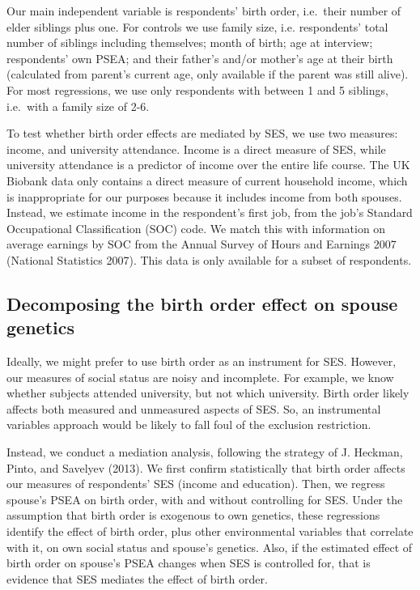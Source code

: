 \documentclass[
]{article}
\begin{document}
Our main independent variable is respondents' birth order, i.e.~their
number of elder siblings plus one. For controls we use family size, i.e.
respondents' total number of siblings including themselves; month of birth; age
at interview; respondents' own PSEA; and their father's and/or mother's age
at their birth (calculated from parent's current age, only available if
the parent was still alive). For most regressions, we use only
respondents with between 1 and 5 siblings, i.e.~with a family size of
2-6.

To test whether birth order effects are mediated by SES, we use two measures:
income, and university attendance. Income is a direct measure of SES, while
university attendance is a predictor of income over the entire life course. The
UK Biobank data only contains a direct measure of current household income,
which is inappropriate for our purposes because it includes income from both
spouses. Instead, we estimate income in the respondent's first job, from the
job's Standard Occupational Classification (SOC) code. We match this with
information on average earnings by SOC from the Annual Survey of Hours and
Earnings 2007 (National Statistics 2007). This data is only available for a subset of
respondents.

\hypertarget{decomposing-the-birth-order-effect-on-spouse-genetics}{%
\subsection{Decomposing the birth order effect on spouse genetics}\label{decomposing-the-birth-order-effect-on-spouse-genetics}}

Ideally, we might prefer to use birth order as an instrument for SES. However,
our measures of social status are noisy and incomplete. For example, we know
whether subjects attended university, but not which university. Birth order
likely affects both measured and unmeasured aspects of SES. So, an instrumental
variables approach would be likely to fall foul of the exclusion restriction.

Instead, we conduct a mediation analysis, following the strategy of
J. Heckman, Pinto, and Savelyev (2013). We first confirm statistically that birth
order affects our measures of respondents' SES (income and education).
Then, we regress spouse's PSEA on birth order, with and without
controlling for SES. Under the assumption that birth order is exogenous
to own genetics, these regressions identify the effect of birth order,
plus other environmental variables that correlate with it, on own social
status and spouse's genetics. Also, if the estimated effect of birth
order on spouse's PSEA changes when SES is controlled for, that is
evidence that SES mediates the effect of birth order.
\end{document}
